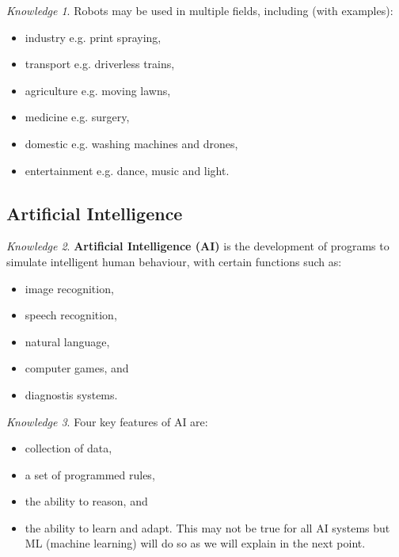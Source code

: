 \documentclass[8pt]{article}
\theoremstyle{remark}
\newtheorem{knowledge}{Knowledge}[subsection]
\begin{document}
            \begin{knowledge}
                Robots may be used in multiple fields, including (with examples):
                \begin{itemize}
                    \item industry e.g. print spraying,
                    \item transport e.g. driverless trains,
                    \item agriculture e.g. moving lawns,
                    \item medicine e.g. surgery,
                    \item domestic e.g. washing machines and drones,
                    \item entertainment e.g. dance, music and light.
                \end{itemize}
            \end{knowledge}
        \subsection{Artificial Intelligence}

            \begin{knowledge}
                \textbf{Artificial Intelligence (AI)} is the development of programs to simulate intelligent human behaviour, with certain functions such as:
                \begin{itemize}
                    \item image recognition,
                    \item speech recognition,
                    \item natural language,
                    \item computer games, and
                    \item diagnostis systems.
                \end{itemize}
            \end{knowledge}

            \begin{knowledge}
                Four key features of AI are:
                \begin{itemize}
                    \item collection of data,
                    \item a set of programmed rules,
                    \item the ability to reason, and
                    \item the ability to learn and adapt. This may not be true for all AI systems but ML (machine learning) will do so as we will explain in the next point.
                \end{itemize}
            \end{knowledge}
\end{document}
